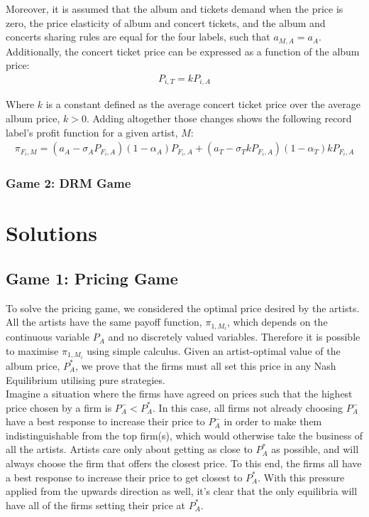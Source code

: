 \documentclass[a4paper,12pt]{article}
\numberwithin{equation}{section}
\newcommand{\artistpayoff}[2]{\pi_{#1, M_{#2}}}
\begin{document}
Moreover, it is assumed that the album and tickets demand when the price is zero, the price elasticity of album and concert tickets, and the album and concerts sharing rules are equal for the four labels, such that $a_{M, A} = a_A$. Additionally, the concert ticket price can be expressed as a function of the album price:
\begin{eqnarray*}
P_{i, T} = k P_{i, A}
\end{eqnarray*}

Where $k$ is a constant defined as the average concert ticket price over the average album price, $k > 0$. Adding altogether those changes shows the following record label’s profit function for a given artist, $M$:
\begin{eqnarray}
\pi_{F_i, M} = (a_A - \sigma_A P_{F_i, A})(1 - \alpha_A) P_{F_i, A} +
	(a_T - \sigma_T k P_{F_i, A}) (1 - \alpha_T) k P_{F_i, A}
\end{eqnarray}

\subsubsection{Game 2: DRM Game}


\pagebreak
\section{Solutions}

\subsection{Game 1: Pricing Game}

To solve the pricing game, we considered the optimal price desired by the artists. All the artists have the same payoff function, $\artistpayoff{1}{i}$, which depends on the continuous variable $P_A$ and no discretely valued variables. Therefore it is possible to maximise $\artistpayoff{1}{i}$ using simple calculus. Given an artist-optimal value of the album price, $P_A^*$, we prove that the firms must all set this price in any Nash Equilibrium utilising pure strategies.\\

Imagine a situation where the firms have agreed on prices such that the highest price chosen by a firm is $P_A^- < P_A^*$. In this case, all firms not already choosing $P_A^-$ have a best response to increase their price to $P_A^-$ in order to make them indistinguishable from the top firm(s), which would otherwise take the business of all the artists. Artists care only about getting as close to $P_A^*$ as possible, and will always choose the firm that offers the closest price. To this end, the firms all have a best response to increase their price to get closest to $P_A^*$. With this pressure applied from the upwards direction as well, it's clear that the only equilibria will have all of the firms setting their price at $P_A^*$.\\
\end{document}

